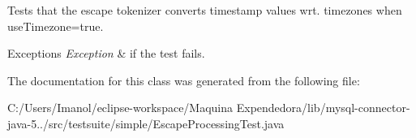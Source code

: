 Tests that the escape tokenizer converts timestamp values wrt. timezones when use\+Timezone=true.


\begin{DoxyExceptions}{Exceptions}
{\em Exception} & if the test fails. \\
\hline
\end{DoxyExceptions}


The documentation for this class was generated from the following file\+:\begin{DoxyCompactItemize}
\item 
C\+:/\+Users/\+Imanol/eclipse-\/workspace/\+Maquina Expendedora/lib/mysql-\/connector-\/java-\/5../src/testsuite/simple/Escape\+Processing\+Test.\+java\end{DoxyCompactItemize}
